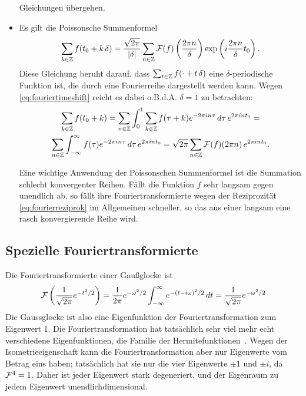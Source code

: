 \begin{itemize}
  Gleichungen übergehen.
\item Es gilt die Poissonsche Summenformel
  \begin{equation}
    \label{eq:poissonsumme}
    \sum_{k\in\mathbb{Z}}f(t_0 + k\, \delta)=
    \frac{\sqrt{2\pi}}{|\delta|}\sum_{n\in\mathbb{Z}}\mathcal F(f)
    \left(\frac{2\pi n}{\delta}\right)
    \exp\left(i \frac{2\pi n}{\delta} t_0\right).
  \end{equation}
  Diese Gleichung beruht darauf, dass $\sum_{t\in\mathbb{Z}}f(\cdot + t\,
  \delta)$ eine $\delta$-periodische Funktion ist, die durch eine
  Fourierreihe dargestellt werden kann. Wegen
  \eqref{eq:fouriertimeshift} reicht es
  dabei o.B.d.A. $\delta=1$ zu
  betrachten:
  \begin{multline}
    \sum_{k\in\mathbb{Z}}f(t_0 + k) =
    \sum_{n\in\mathbb{Z}} \int_0^1 \sum_{k\in\mathbb{Z}}f(\tau + k)e^{-2\pi i
      n \tau}\, d\tau
    \, e^{2\pi i n t_0} =\\
    \sum_{n\in\mathbb{Z}} \int_{-\infty}^\infty f(\tau)e^{-2\pi i
      n \tau}\, d\tau
    \, e^{2\pi i n t_0}
    = \sqrt{2\pi}\sum_{n\in\mathbb{Z}}\mathcal F(f)(2\pi n)\, e^{2\pi i n t_0}.
  \end{multline}

  Eine wichtige Anwendung der Poissonschen Summenformel ist die
  Summation schlecht konvergenter Reihen. Fällt die Funktion $f$ sehr
  langsam gegen unendlich ab, so fällt ihre Fouriertransformierte
  wegen der Reziprozität \eqref{eq:fourierreziprok} im Allgemeinen
  schneller, so das aus einer langsam eine rasch konvergierende Reihe
  wird.
\end{itemize}

\subsection{Spezielle Fouriertransformierte}

Die Fouriertransformierte einer Gaußglocke ist
\begin{equation}
  \mathcal F\left(\frac{1}{\sqrt{2\pi}}e^{-t^2/2}\right)
  =
  \frac{1}{2\pi}e^{-\omega^2/2}\int_{-\infty}^{\infty} e^{-(t-i\omega)^2/2}\, dt
  =
  \frac{1}{\sqrt{2\pi}}e^{-\omega^2/2}
\end{equation}
Die Gaussglocke ist also eine Eigenfunktion der Fouriertransformation
zum Eigenwert 1. Die Fouriertransformation hat tatsächlich sehr viel
mehr echt verschiedene Eigenfunktionen, die Familie der
Hermitefunktionen~\cite{pinsky02a}. Wegen der Isometrieeigenschaft kann die
Fouriertransformation aber nur Eigenwerte vom Betrag eins haben;
tatsächlich hat sie nur die vier Eigenwerte $\pm 1$ und $\pm i$, da
$\mathcal F^4=1$. Daher ist jeder Eigenwert stark degeneriert, und der
Eigenraum zu jedem Eigenwert unendlichdimensional.

